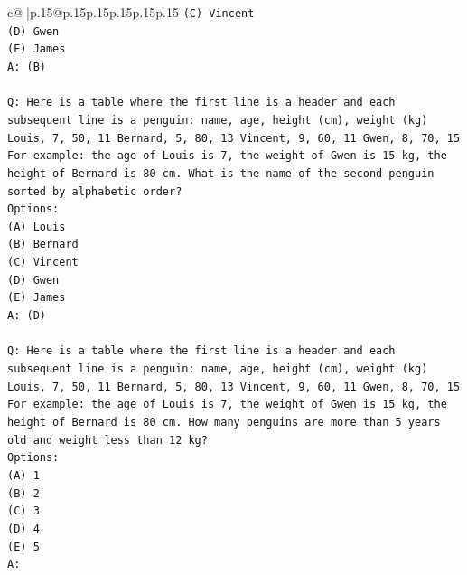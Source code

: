 \documentclass{article}
\begin{document}
{\begin{supertabular}{c@{$\;$}|p{.15\linewidth}@{}p{.15\linewidth}p{.15\linewidth}p{.15\linewidth}p{.15\linewidth}p{.15\linewidth}}
{{{\texttt{(C) Vincent} \\
\texttt{(D) Gwen} \\
\texttt{(E) James} \\
\texttt{A: (B)} \\
\\ 
\texttt{Q: Here is a table where the first line is a header and each subsequent line is a penguin:  name, age, height (cm), weight (kg) Louis, 7, 50, 11 Bernard, 5, 80, 13 Vincent, 9, 60, 11 Gwen, 8, 70, 15  For example: the age of Louis is 7, the weight of Gwen is 15 kg, the height of Bernard is 80 cm.  What is the name of the second penguin sorted by alphabetic order?} \\
\texttt{Options:} \\
\texttt{(A) Louis} \\
\texttt{(B) Bernard} \\
\texttt{(C) Vincent} \\
\texttt{(D) Gwen} \\
\texttt{(E) James} \\
\texttt{A: (D)} \\
\\ 
\texttt{Q: Here is a table where the first line is a header and each subsequent line is a penguin:  name, age, height (cm), weight (kg) Louis, 7, 50, 11 Bernard, 5, 80, 13 Vincent, 9, 60, 11 Gwen, 8, 70, 15  For example: the age of Louis is 7, the weight of Gwen is 15 kg, the height of Bernard is 80 cm.  How many penguins are more than 5 years old and weight less than 12 kg?} \\
\texttt{Options:} \\
\texttt{(A) 1} \\
\texttt{(B) 2} \\
\texttt{(C) 3} \\
\texttt{(D) 4} \\
\texttt{(E) 5} \\
\texttt{A:} \\
            }
        }
    }
     \\ \\


\end{supertabular}}
\end{document}
